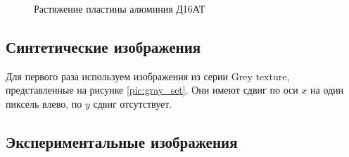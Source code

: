 \begin{figure}[ht]
\caption{Растяжение пластины алюминия Д16АТ}
\label{pic:real_deform}
\end{figure}

\subsection{Синтетические изображения}

Для первого раза используем изображения из серии Grey texture, представленные на рисунке \ref{pic:gray_set}. Они имеют сдвиг по оси $x$ на один пиксель влево, по $y$ сдвиг отсутствует.


\subsection{Экспериментальные изображения}